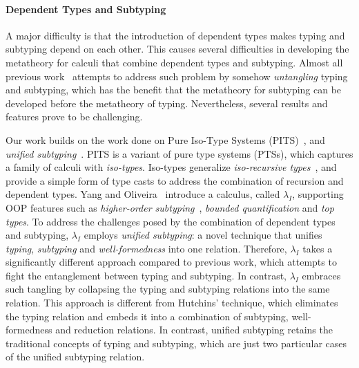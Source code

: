 \paragraph{Dependent Types and Subtyping}
A major difficulty is that the introduction of dependent
types makes typing and subtyping depend on each other. This causes
several difficulties in developing the metatheory for calculi that
combine dependent types and subtyping. Almost all previous
work~\cite{subdep,ptssub,chen1,cocsub,Chen03coc} attempts to address such problem by somehow
\emph{untangling} typing and subtyping, which has the benefit that the
metatheory for subtyping can be developed before the metatheory of
typing. Nevertheless, several results and features prove to be
challenging.

Our work builds on the work done on Pure Iso-Type Systems (PITS)~\cite{yang2019pure}, and
\emph{unified subtyping}~\cite{full}. PITS is a variant of pure type systems (PTSs),
which captures a family of calculi with \emph{iso-types}.
Iso-types generalize \emph{iso-recursive
types}~\cite{tapl}, and provide a simple form of
type casts to address the combination of recursion and
dependent types.
Yang and Oliveira~\cite{full} introduce a calculus, called $\lambda_{I}$, supporting OOP features such as
\emph{higher-order subtyping}~\cite{fsubo}, \emph{bounded quantification} and
\emph{top types}.
To address the challenges posed by
the combination of dependent types and subtyping, $\lambda_{I}$
employs \emph{unified subtyping}: a novel technique that unifies
\emph{typing}, \emph{subtyping} and \emph{well-formedness} into one
relation. Therefore, $\lambda_{I}$ takes a significantly different
approach compared to previous work, which
attempts to fight the entanglement between typing and subtyping. In
contrast, $\lambda_{I}$ embraces such
tangling by collapsing the typing and subtyping
relations into the same relation. This approach is different from
Hutchins' technique, which eliminates the typing relation and embeds it into
a combination of subtyping, well-formedness and reduction relations.
In contrast, unified subtyping
retains the traditional concepts of typing and subtyping, which are just two
particular cases of the unified subtyping relation.

